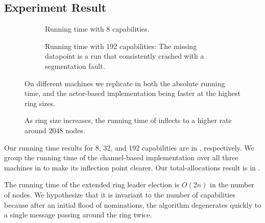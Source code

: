 \documentclass[sigplan,screen]{acmart}
\begin{document}
\subsection{Experiment Result}
\label{apx:exp-result}

\begin{figure}
    \begin{subfigure}{\linewidth}
    {\small \def\svgwidth{\linewidth}
 }
    \caption{Running time with 8 capabilities.}
    \label{fig:perf-eval-time-n8}
    \end{subfigure}

    \begin{subfigure}{\linewidth}
    {\small \def\svgwidth{\linewidth}
 }
    \caption{
        Running time with 192 capabilities:
        The missing datapoint is a run that consistently crashed with a segmentation fault.
    }
    \label{fig:perf-eval-time-n192}
    \end{subfigure}

\caption{
    On different machines we replicate
     in both the absolute running time, and
    the actor-based implementation being faster at the highest
    ring sizes.
}
\label{fig:perf-eval-time-rest}
\end{figure}

\begin{figure}
    {\small
        \def\svgwidth{\linewidth}

    }
    \caption{
        As ring size increases,
        the running time of 
        inflects to a higher rate around $2048$ nodes.
    }
    \label{fig:perf-group-chan}
\end{figure}

Our running time results for 8, 32, and 192 capabilities are in
,
respectively.
%
We group the running time of the channel-based implementation over all three
machines in  to make its inflection point clearer.
%
Our total-allocations result is in .

The running time of the extended ring leader election is $O(2n)$ in the number
of nodes.
%
We hypothesize that it is invariant to the number of capabilities because after
an initial flood of nominations, the algorithm degenerates quickly to a single
message passing around the ring twice.
\end{document}
